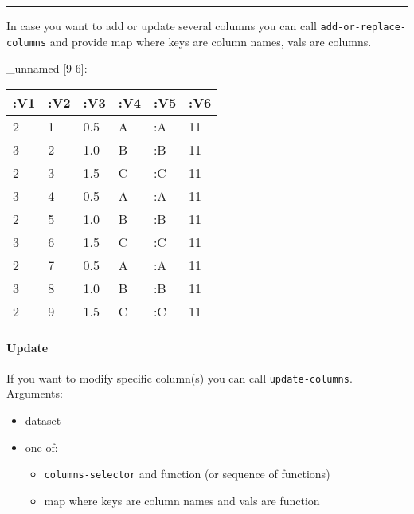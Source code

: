 \documentclass[]{article}
\newenvironment{Shaded}{\begin{snugshade}}{\end{snugshade}}
\newcommand{\AttributeTok}[1]{\textcolor[rgb]{0.77,0.63,0.00}{#1}}
\newcommand{\DecValTok}[1]{\textcolor[rgb]{0.00,0.00,0.81}{#1}}
\newcommand{\KeywordTok}[1]{\textcolor[rgb]{0.13,0.29,0.53}{\textbf{#1}}}
\newcommand{\NormalTok}[1]{#1}
\newcommand{\VariableTok}[1]{\textcolor[rgb]{0.00,0.00,0.00}{#1}}
\providecommand{\tightlist}{%
  \setlength{\itemsep}{0pt}\setlength{\parskip}{0pt}}
\let\oldparagraph\paragraph
\renewcommand{\paragraph}[1]{\oldparagraph{#1}\mbox{}}
\begin{document}
\begin{center}\rule{0.5\linewidth}{0.5pt}\end{center}

In case you want to add or update several columns you can call
\texttt{add-or-replace-columns} and provide map where keys are column
names, vals are columns.

\begin{Shaded}
\end{Shaded}

\_unnamed {[}9 6{]}:

\begin{longtable}[]{@{}llllll@{}}
\toprule
:V1 & :V2 & :V3 & :V4 & :V5 & :V6\tabularnewline
\midrule
\endhead
2 & 1 & 0.5 & A & :A & 11\tabularnewline
3 & 2 & 1.0 & B & :B & 11\tabularnewline
2 & 3 & 1.5 & C & :C & 11\tabularnewline
3 & 4 & 0.5 & A & :A & 11\tabularnewline
2 & 5 & 1.0 & B & :B & 11\tabularnewline
3 & 6 & 1.5 & C & :C & 11\tabularnewline
2 & 7 & 0.5 & A & :A & 11\tabularnewline
3 & 8 & 1.0 & B & :B & 11\tabularnewline
2 & 9 & 1.5 & C & :C & 11\tabularnewline
\bottomrule
\end{longtable}

\hypertarget{update}{%
\paragraph{Update}\label{update}}

If you want to modify specific column(s) you can call
\texttt{update-columns}. Arguments:

\begin{itemize}
\tightlist
\item
  dataset
\item
  one of:

  \begin{itemize}
  \tightlist
  \item
    \texttt{columns-selector} and function (or sequence of functions)
  \item
    map where keys are column names and vals are function
  \end{itemize}
\end{itemize}
\end{document}
